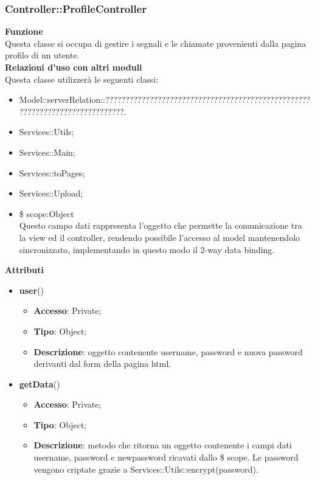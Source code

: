 {\subsubsection{Controller::ProfileController}{
	\textbf{Funzione}\\
	\indent Questa classe si occupa di gestire i segnali e le chiamate provenienti dalla pagina profilo di un utente.\\
	\textbf{Relazioni d'uso con altri moduli}\\
	\indent Questa classe utilizzerà le seguenti classi:
	\begin{itemize}
		\item Model::\-serverRelation::\-?????????????????????????????????????????????????????????????????????????????.
		\item Services::Utils;
		\item Services::Main;
		\item Services::toPages;
		\item Services::Upload;
		\item \$ scope:Object\\
			\indent Questo campo dati rappresenta l’oggetto che permette la comunicazione tra la view ed il controller, rendendo possibile l’accesso al model mantenendolo sincronizzato, implementando in questo modo il 2-way data binding.
	\end{itemize}
	\textbf{Attributi}\\
    \begin{itemize}
    	\item \textbf{user}()
		\begin{itemize}
			\item \textbf{Accesso}: Private;
			\item \textbf{Tipo}: Object;
			\item \textbf{Descrizione}: oggetto contenente username, password e nuova password derivanti dal form della pagina html.
		\end{itemize}
    	\item \textbf{getData}()
		\begin{itemize}
			\item \textbf{Accesso}: Private;
			\item \textbf{Tipo}: Object;
			\item \textbf{Descrizione}: metodo che ritorna un oggetto contenente i campi dati username, password e newpassword ricavati dallo \$ scope. Le password vengono criptate grazie a Services::\-Utils::\-encrypt(password).
		\end{itemize}

\end{itemize}}}
